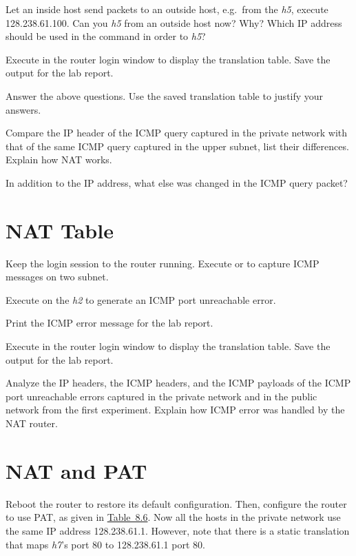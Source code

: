 \documentclass{../UTNetLab}
\begin{document}
Let an inside host send packets to an outside host, e.g.\ from the \textit{h5}, execute  128.238.61.100.
Can you  \textit{h5} from an outside host now? Why? Which IP address should be used in the  command in order to  \textit{h5}?

Execute  in the router login window to display the translation table.
Save the output for the lab report.

\begin{report}
    \item Answer the above questions.
    Use the saved translation table to justify your answers.

    \item Compare the IP header of the ICMP query captured in the private network with that of the same ICMP query captured in the upper subnet, list their differences.
    Explain how NAT works.

    \item In addition to the IP address, what else was changed in the ICMP query packet?
\end{report}

\section{NAT Table}
Keep the login session to the router running.
Execute  or  to capture ICMP messages on two subnet.

Execute  on the \textit{h2} to generate an ICMP port unreachable error.

Print the ICMP error message for the lab report.

Execute  in the router login window to display the translation table.
Save the output for the lab report.

\begin{report}
    \item Analyze the IP headers, the ICMP headers, and the ICMP payloads of the ICMP port unreachable errors captured in the private network and in the public network from the first experiment.
    Explain how ICMP error was handled by the NAT router.
\end{report}

\section{NAT and PAT}
Reboot the router to restore its default configuration.
Then, configure the router to use PAT, as given in \hyperref[tab:8.6]{Table~8.6}.
Now all the hosts in the private network use the same IP address 128.238.61.1.
However, note that there is a static translation that maps \textit{h7}’s port 80 to 128.238.61.1 port 80.
\end{document}
